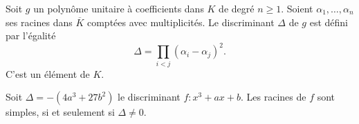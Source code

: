 \begin{lemme}
    Soit $g$ un polynôme unitaire à coefficients dans $K$ de degré $n \ge 1$. Soient $\alpha_1,\ldots,\alpha_{n}$ ses racines dans $\overline{K}$ comptées avec multiplicités. Le discriminant $\Delta$ de $g$ est défini par l'égalité
    \[
    \Delta = \prod_{i < j}^{} \left( \alpha_{i} - \alpha_{j} \right)^2 
    .\] 
    C'est un élément de $K$.
\end{lemme}

\begin{demonstration}
    
\end{demonstration}
\begin{lemme}
    Soit $\Delta= -(4a^3 + 27b^2)$ le discriminant $f : x^3 + ax + b$. 
    Les racines de $f$ sont simples, si et seulement si $\Delta \neq 0$.
\end{lemme}

